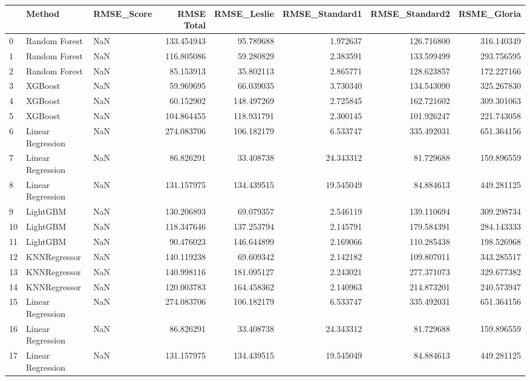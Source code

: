 \begin{tabular}{lllrrrrr}
\toprule
{} &             Method & RMSE\_Score &  RMSE Total &  RMSE\_Leslie &  RMSE\_Standard1 &  RMSE\_Standard2 &  RSME\_Gloria \\
\midrule
0  &      Random Forest &        NaN &  133.454943 &    95.789688 &        1.972637 &      126.716800 &   316.140349 \\
1  &      Random Forest &        NaN &  116.805086 &    59.280829 &        2.383591 &      133.599499 &   293.756595 \\
2  &      Random Forest &        NaN &   85.153913 &    35.802113 &        2.865771 &      128.623857 &   172.227166 \\
3  &            XGBoost &        NaN &   59.969695 &    66.039035 &        3.730340 &      134.543090 &   325.267830 \\
4  &            XGBoost &        NaN &   60.152902 &   148.497269 &        2.725845 &      162.721602 &   309.301063 \\
5  &            XGBoost &        NaN &  104.864455 &   118.931791 &        2.300145 &      101.926247 &   221.743058 \\
6  &  Linear Regression &        NaN &  274.083706 &   106.182179 &        6.533747 &      335.492031 &   651.364156 \\
7  &  Linear Regression &        NaN &   86.826291 &    33.408738 &       24.343312 &       81.729688 &   159.896559 \\
8  &  Linear Regression &        NaN &  131.157975 &   134.439515 &       19.545049 &       84.884613 &   449.281125 \\
9  &           LightGBM &        NaN &  130.206893 &    69.079357 &        2.546119 &      139.110694 &   309.298734 \\
10 &           LightGBM &        NaN &  118.347646 &   137.253794 &        2.145791 &      179.584391 &   284.143333 \\
11 &           LightGBM &        NaN &   90.476023 &   146.644899 &        2.169066 &      110.285438 &   198.526968 \\
12 &       KNNRegressor &        NaN &  140.119238 &    69.609342 &        2.142182 &      109.807011 &   343.285517 \\
13 &       KNNRegressor &        NaN &  140.998116 &   181.095127 &        2.243021 &      277.371073 &   329.677382 \\
14 &       KNNRegressor &        NaN &  120.003783 &   164.458362 &        2.140963 &      214.873201 &   240.573947 \\
15 &  Linear Regression &        NaN &  274.083706 &   106.182179 &        6.533747 &      335.492031 &   651.364156 \\
16 &  Linear Regression &        NaN &   86.826291 &    33.408738 &       24.343312 &       81.729688 &   159.896559 \\
17 &  Linear Regression &        NaN &  131.157975 &   134.439515 &       19.545049 &       84.884613 &   449.281125 \\
\bottomrule
\end{tabular}
